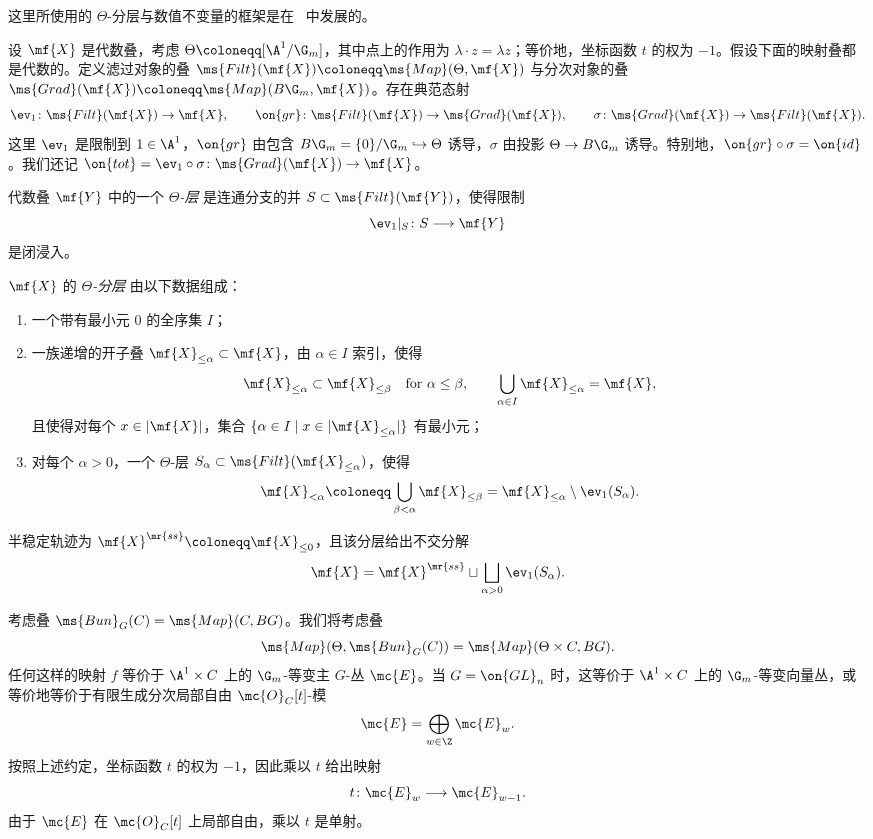 这里所使用的 \(\Theta\)-分层与数值不变量的框架是在~\cite{HLinstability} 中发展的。

设 \(\mf{X}\) 是代数叠，考虑 \(\Theta\coloneqq[\A^1/\G_m]\)，其中点上的作用为 \(\lambda\cdot z=\lambda z\)；等价地，坐标函数 \(t\) 的权为 \(-1\)。假设下面的映射叠都是代数的。定义滤过对象的叠 \(\ms{Filt}(\mf{X})\coloneqq\ms{Map}(\Theta,\mf{X})\) 与分次对象的叠 \(\ms{Grad}(\mf{X})\coloneqq\ms{Map}(B\G_m,\mf{X})\)。存在典范态射
\[
    \ev_1\colon\ms{Filt}(\mf{X})\to\mf{X},
    \qquad
    \on{gr}\colon\ms{Filt}(\mf{X})\to\ms{Grad}(\mf{X}),
    \qquad
    \sigma\colon\ms{Grad}(\mf{X})\to\ms{Filt}(\mf{X}).
\]
这里 \(\ev_1\) 是限制到 \(1\in\A^1\)，\(\on{gr}\) 由包含 \(B\G_m=\{0\}/\G_m\hookrightarrow\Theta\) 诱导，\(\sigma\) 由投影 \(\Theta\to B\G_m\) 诱导。特别地，\(\on{gr}\circ\sigma=\on{id}\)。我们还记 \(\on{tot}=\ev_1\circ\sigma\colon\ms{Grad}(\mf{X})\to\mf{X}\)。

\begin{defn}
    代数叠 \(\mf{Y}\) 中的一个 \textit{\(\Theta\)-层} 是连通分支的并 \(S\subset\ms{Filt}(\mf{Y})\)，使得限制
    \[
        \ev_1|_S\colon S\longrightarrow\mf{Y}
    \]
    是闭浸入。

    \(\mf{X}\) 的 \textit{\(\Theta\)-分层} 由以下数据组成：
    \begin{enumerate}
        \item 一个带有最小元 \(0\) 的全序集 \(I\)；
        \item 一族递增的开子叠 \(\mf{X}_{\leq\alpha}\subset\mf{X}\)，由 \(\alpha\in I\) 索引，使得
        \[
            \mf{X}_{\leq\alpha}\subset\mf{X}_{\leq\beta}
            \quad\text{for }\alpha\leq\beta,
            \qquad
            \bigcup_{\alpha\in I}\mf{X}_{\leq\alpha}=\mf{X},
        \]
        且使得对每个 \(x\in|\mf{X}|\)，集合 \(\{\alpha\in I\mid x\in|\mf{X}_{\leq\alpha}|\}\) 有最小元；
        \item 对每个 \(\alpha>0\)，一个 \(\Theta\)-层 \(S_\alpha\subset\ms{Filt}(\mf{X}_{\leq\alpha})\)，使得
        \[
            \mf{X}_{<\alpha}
            \coloneqq
            \bigcup_{\beta<\alpha}\mf{X}_{\leq\beta}
            =
            \mf{X}_{\leq\alpha}\setminus\ev_1(S_\alpha).
        \]
    \end{enumerate}
    半稳定轨迹为 \(\mf{X}^{\mr{ss}}\coloneqq\mf{X}_{\leq0}\)，且该分层给出不交分解
    \[
        \mf{X}
        =
        \mf{X}^{\mr{ss}}
        \sqcup
        \bigsqcup_{\alpha>0}\ev_1(S_\alpha).
    \]
\end{defn}

考虑叠 \(\ms{Bun}_G(C) = \ms{Map}(C, BG)\)。我们将考虑叠
\[ \ms{Map}(\Theta, \ms{Bun}_G(C)) = \ms{Map}(\Theta \times C, BG). \]
任何这样的映射 \(f\) 等价于 \(\A^1\times C\) 上的 \(\G_m\)-等变主 \(G\)-丛 \(\mc{E}\)。当 \(G=\on{GL}_n\) 时，这等价于 \(\A^1\times C\) 上的 \(\G_m\)-等变向量丛，或等价地等价于有限生成分次局部自由 \(\mc{O}_C[t]\)-模
\[
    \mc{E}=\bigoplus_{w\in\Z}\mc{E}_w.
\]
按照上述约定，坐标函数 \(t\) 的权为 \(-1\)，因此乘以 \(t\) 给出映射
\[
    t\colon\mc{E}_w\longrightarrow\mc{E}_{w-1}.
\]
由于 \(\mc{E}\) 在 \(\mc{O}_C[t]\) 上局部自由，乘以 \(t\) 是单射。

